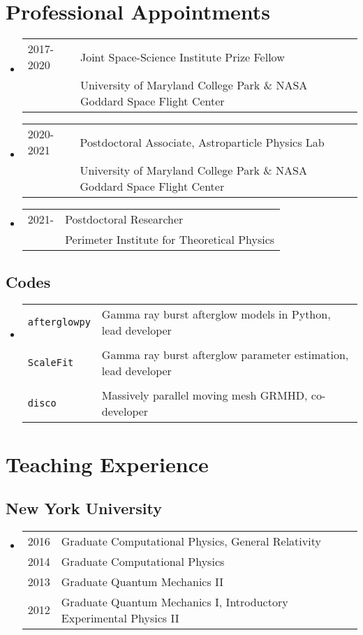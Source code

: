 \section*{Professional Appointments} %
\begin{itemize}
\item \begin{tabular}{ll}
2017-2020 & Joint Space-Science Institute Prize Fellow \\
	 & University of Maryland College Park \& NASA Goddard Space Flight Center\\
\end{tabular}
\item \begin{tabular}{ll}
2020-2021 & Postdoctoral Associate, Astroparticle Physics Lab\\
	  & University of Maryland College Park \& NASA Goddard Space Flight Center\\
\end{tabular}
\item \begin{tabular}{ll}
2021-\hphantom{2020} & Postdoctoral Researcher\\
	  & Perimeter Institute for Theoretical Physics
\end{tabular}
\end{itemize}


\subsection*{Codes}
\begin{itemize}
\item \begin{tabular}{ll}
\texttt{afterglowpy} & Gamma ray burst afterglow models in Python, lead developer\\
& \\
\texttt{ScaleFit} & Gamma ray burst afterglow parameter estimation, lead developer\\
& \\
\texttt{disco} & Massively parallel moving mesh GRMHD, co-developer
\end{tabular}
\end{itemize}

\section*{Teaching Experience}
\subsection*{New York University}
\begin{itemize}
\item \begin{tabular}{ll}
2016 & Graduate Computational Physics, General Relativity \\
2014 & Graduate Computational Physics \\
2013 & Graduate Quantum Mechanics II \\
2012 & Graduate Quantum Mechanics I, Introductory Experimental Physics II
\end{tabular}
\end{itemize}

